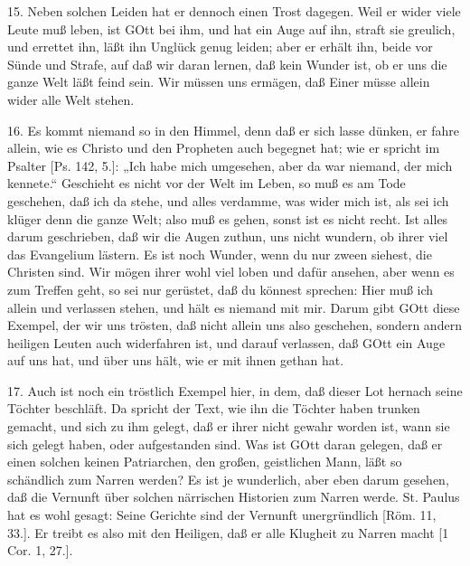 15. Neben solchen Leiden hat er dennoch einen Trost dagegen. Weil er wider viele Leute muß leben, ist GOtt bei ihm, und hat ein Auge auf ihn, straft sie greulich, und errettet ihn, läßt ihn Unglück genug leiden; aber er erhält ihn, beide vor Sünde und Strafe, auf daß wir daran lernen, daß kein Wunder ist, ob er uns die ganze Welt läßt feind sein. Wir müssen uns ermägen, daß Einer müsse allein wider alle Welt stehen.

16. Es kommt niemand so in den Himmel, denn daß er sich lasse dünken, er fahre allein, wie es Christo und den Propheten auch begegnet hat; wie er spricht im Psalter [Ps. 142, 5.]: „Ich habe mich umgesehen, aber da war niemand, der mich kennete.“ Geschieht es nicht vor der Welt im Leben, so muß es am Tode geschehen, daß ich da stehe, und alles verdamme, was wider mich ist, als sei ich klüger denn die ganze Welt; also muß es gehen, sonst ist es nicht recht. Ist alles darum geschrieben, daß wir die Augen zuthun, uns nicht wundern, ob ihrer viel das Evangelium lästern. Es ist noch Wunder, wenn du nur zween siehest, die Christen sind. Wir mögen ihrer wohl viel loben und dafür ansehen, aber wenn es zum Treffen geht, so sei nur gerüstet, daß du könnest sprechen: Hier muß ich allein und verlassen stehen, und hält es niemand mit mir. Darum gibt GOtt diese Exempel, der wir uns trösten, daß nicht allein uns also geschehen, sondern andern heiligen Leuten auch widerfahren ist, und darauf verlassen, daß GOtt ein Auge auf uns hat, und über uns hält, wie er mit ihnen gethan hat.

17. Auch ist noch ein tröstlich Exempel hier, in dem, daß dieser Lot hernach seine Töchter beschläft. Da spricht der Text, wie ihn die Töchter haben trunken gemacht, und sich zu ihm gelegt, daß er ihrer nicht gewahr worden ist, wann sie sich gelegt haben, oder aufgestanden sind. Was ist GOtt daran gelegen, daß er einen solchen keinen Patriarchen, den großen, geistlichen Mann, läßt so schändlich zum Narren werden? Es ist je wunderlich, aber eben darum
gesehen, daß die Vernunft über solchen närrischen Historien zum Narren werde. St. Paulus hat es wohl gesagt: Seine Gerichte sind der Vernunft unergründlich [Röm. 11, 33.]. Er treibt es also mit den Heiligen, daß er alle Klugheit zu Narren macht [1 Cor. 1, 27.].

